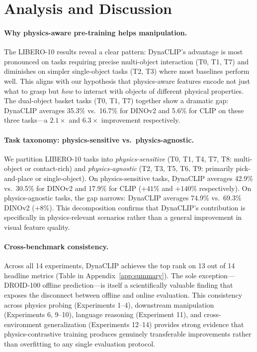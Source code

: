 \documentclass{article}
\newcommand{\methodname}{DynaCLIP}
\begin{document}
\section{Analysis and Discussion}
\label{sec:discussion}

\paragraph{Why physics-aware pre-training helps manipulation.}
The LIBERO-10 results reveal a clear pattern: \methodname{}'s advantage is most pronounced on tasks requiring precise multi-object interaction (T0, T1, T7) and diminishes on simpler single-object tasks (T2, T3) where most baselines perform well. This aligns with our hypothesis that physics-aware features encode not just what to grasp but \emph{how} to interact with objects of different physical properties. The dual-object basket tasks (T0, T1, T7) together show a dramatic gap: \methodname{} averages 35.3\% vs.\ 16.7\% for DINOv2 and 5.6\% for CLIP on these three tasks---a $2.1\times$ and $6.3\times$ improvement respectively.

\paragraph{Task taxonomy: physics-sensitive vs.\ physics-agnostic.}
We partition LIBERO-10 tasks into \emph{physics-sensitive} (T0, T1, T4, T7, T8: multi-object or contact-rich) and \emph{physics-agnostic} (T2, T3, T5, T6, T9: primarily pick-and-place or single-object). On physics-sensitive tasks, \methodname{} averages 42.9\% vs.\ 30.5\% for DINOv2 and 17.9\% for CLIP ($+41\%$ and $+140\%$ respectively). On physics-agnostic tasks, the gap narrows: \methodname{} averages 74.9\% vs.\ 69.3\% DINOv2 ($+8\%$). This decomposition confirms that \methodname{}'s contribution is specifically in physics-relevant scenarios rather than a general improvement in visual feature quality.

\paragraph{Cross-benchmark consistency.}
Across all 14 experiments, \methodname{} achieves the top rank on 13 out of 14 headline metrics (Table in Appendix~\ref{app:summary}). The sole exception---DROID-100 offline prediction---is itself a scientifically valuable finding that exposes the disconnect between offline and online evaluation. This consistency across physics probing (Experiments 1--4), downstream manipulation (Experiments 6, 9--10), language reasoning (Experiment 11), and cross-environment generalization (Experiments 12--14) provides strong evidence that physics-contrastive training produces genuinely transferable improvements rather than overfitting to any single evaluation protocol.
\end{document}
